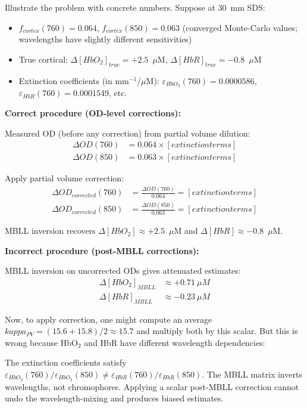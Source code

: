 \documentclass[12pt]{article}
\def\kappa{kappa}%
\def\text#1{#1}%
\begin{document}
\begin{workexample}
Illustrate the problem with concrete numbers. Suppose at 30~mm SDS:
\begin{itemize}
\item $f_{\text{cortex}}(760) = 0.064$, $f_{\text{cortex}}(850) = 0.063$ (converged Monte-Carlo values; wavelengths have slightly different sensitivities)
\item True cortical: $\Delta[\text{HbO}_2]_{\text{true}} = +2.5$~$\mu$M, $\Delta[\text{HbR}]_{\text{true}} = -0.8$~$\mu$M
\item Extinction coefficients (in mm$^{-1}$/$\mu$M): $\varepsilon_{\text{HbO}_2}(760) = 0.0000586$, $\varepsilon_{\text{HbR}}(760) = 0.0001549$, etc.
\end{itemize}

\textbf{Correct procedure (OD-level corrections):}

Measured OD (before any correction) from partial volume dilution:
\begin{align}
\Delta\text{OD}(760) &= 0.064 \times [\text{extinction terms}] \\
\Delta\text{OD}(850) &= 0.063 \times [\text{extinction terms}]
\end{align}

Apply partial volume correction:
\begin{align}
\Delta\text{OD}_{\text{corrected}}(760) &= \frac{\Delta\text{OD}(760)}{0.064} = [\text{extinction terms}] \\
\Delta\text{OD}_{\text{corrected}}(850) &= \frac{\Delta\text{OD}(850)}{0.063} = [\text{extinction terms}]
\end{align}

MBLL inversion recovers $\Delta[\text{HbO}_2] \approx +2.5$~$\mu$M and $\Delta[\text{HbR}] \approx -0.8$~$\mu$M. \checkmark

\textbf{Incorrect procedure (post-MBLL corrections):}

MBLL inversion on uncorrected ODs gives attenuated estimates:
\begin{align}
\Delta[\text{HbO}_2]_{\text{MBLL}} &\approx +0.71~\mu\text{M} \\
\Delta[\text{HbR}]_{\text{MBLL}} &\approx -0.23~\mu\text{M}
\end{align}

Now, to apply correction, one might compute an average $\kappa_{\text{PV}} = (15.6 + 15.8)/2 \approx 15.7$ and multiply both by this scalar. But this is wrong because HbO$_2$ and HbR have different wavelength dependencies:

The extinction coefficients satisfy $\varepsilon_{\text{HbO}_2}(760) / \varepsilon_{\text{HbO}_2}(850) \neq \varepsilon_{\text{HbR}}(760) / \varepsilon_{\text{HbR}}(850)$. The MBLL matrix inverts wavelengths, not chromophores. Applying a scalar post-MBLL correction cannot undo the wavelength-mixing and produces biased estimates.
\end{workexample}
\end{document}

